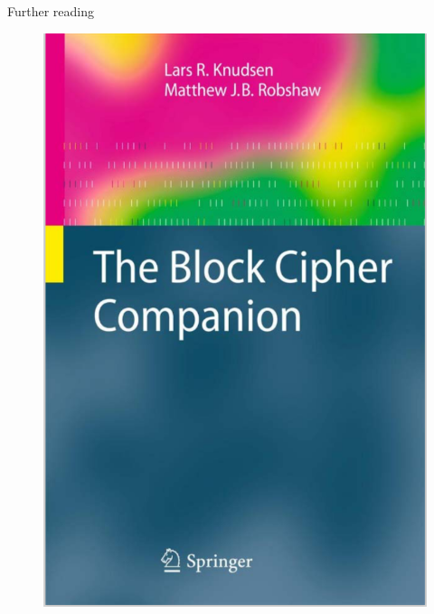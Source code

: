 \documentclass[usenames,dvipsnames, 9pt]{beamer}
\begin{document}
\begin{frame}{Further reading}
	\begin{figure}
		\includegraphics[height=0.7\textheight]{Book_cover}
	\end{figure}
\end{frame}
\end{document}
